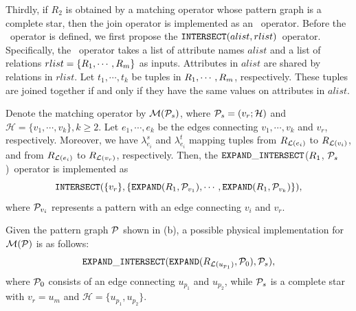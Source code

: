 Thirdly, if $R_2$ is obtained by a matching operator whose pattern graph is a complete star, then the join operator is implemented as an \expandintersect~operator.
Before the \expandintersect~operator is defined, we first propose the $\texttt{INTERSECT}(alist, rlist)$~operator.
Specifically, the \intersect~operator takes a list of attribute names $alist$ and a list of relations $rlist = \{{R_{1}}, \cdots, {R_{m}}\}$ as inputs.
Attributes in $alist$ are shared by relations in $rlist$.
Let $t_1, \cdots, t_k$ be tuples in ${R_{1}}, \cdots, {R_{m}}$, respectively.
These tuples are joined together if and only if they have the same values on attributes in $alist$.


Denote the matching operator by $\mathcal{M}(\mathcal{P}_s)$, where $\mathcal{P}_s = (v_r; \mathcal{H})$ and $\mathcal{H} = \{v_1, \cdots, v_k\}, k \geq 2$.
Let $e_1, \cdots, e_k$ be the edges connecting $v_1, \cdots, v_k$ and $v_r$, respectively.
Moreover, we have $\lambda^s_{e_i}$ and $\lambda^t_{e_i}$ mapping tuples from ${R_{\mathcal{L}(e_i)}}$ to ${R_{\mathcal{L}(v_i)}}$, and from ${R_{\mathcal{L}(e_i)}}$ to ${R_{\mathcal{L}(v_r)}}$, respectively.
Then, the $\texttt{EXPAND}\_\texttt{INTERSECT}$(${R_{1}}$, $\mathcal{P}_s$)~operator is implemented as
\begin{equation*}
    \texttt{INTERSECT}(\{v_r\}, \{{\texttt{EXPAND}}(R_1, \mathcal{P}_{v_1}), \cdots, {\texttt{EXPAND}}(R_1, \mathcal{P}_{v_k})\}),
\end{equation*}
where $\mathcal{P}_{v_i}$ represents a pattern with an edge connecting $v_i$ and $v_r$.

\begin{example}
    Given the pattern graph $\mathcal{P}$ shown in (b), a possible physical implementation for $\mathcal{M}(\mathcal{P})$ is as follows:
    \begin{equation*}
        \texttt{EXPAND}\_\texttt{INTERSECT}({\texttt{EXPAND}}({R_{\mathcal{L}(u_{p_1})}}, \mathcal{P}_{0}), \mathcal{P}_{s}),
    \end{equation*}
    where $\mathcal{P}_{0}$ consists of an edge connecting $u_{p_1}$ and $u_{p_2}$, while $\mathcal{P}_{s}$ is a complete star with $v_r = u_m$ and $\mathcal{H} = \{u_{p_1}, u_{p_2}\}$.
\end{example}

